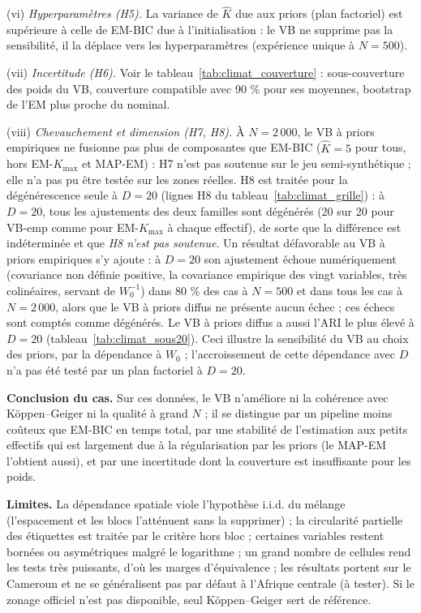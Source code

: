 (vi) \emph{Hyperparamètres (H5).} La variance de $\hat K$ due aux priors (plan factoriel) est supérieure à celle de EM-BIC due à l'initialisation : le VB ne supprime pas la sensibilité, il la déplace vers les hyperparamètres (expérience unique à $N=500$).

(vii) \emph{Incertitude (H6).} Voir le tableau~\ref{tab:climat_couverture} : sous-couverture des poids du VB, couverture compatible avec 90 \% pour ses moyennes, bootstrap de l'EM plus proche du nominal.

(viii) \emph{Chevauchement et dimension (H7, H8).} À $N=2\,000$, le VB à priors empiriques ne fusionne pas plus de composantes que EM-BIC ($\hat K = 5$ pour tous, hors EM-$K_{\max}$ et MAP-EM) : H7 n'est pas soutenue sur le jeu semi-synthétique ; elle n'a pas pu être testée sur les zones réelles. H8 est traitée pour la dégénérescence seule à $D=20$ (lignes H8 du tableau~\ref{tab:climat_grille}) : à $D=20$, tous les ajustements des deux familles sont dégénérés (20 sur 20 pour VB-emp comme pour EM-$K_{\max}$ à chaque effectif), de sorte que la différence est indéterminée et que \emph{H8 n'est pas soutenue}. Un résultat défavorable au VB à priors empiriques s'y ajoute : à $D=20$ son ajustement échoue numériquement (covariance non définie positive, la covariance empirique des vingt variables, très colinéaires, servant de $W_0^{-1}$) dans 80 \% des cas à $N=500$ et dans tous les cas à $N=2\,000$, alors que le VB à priors diffus ne présente aucun échec ; ces échecs sont comptés comme dégénérés. Le VB à priors diffus a aussi l'ARI le plus élevé à $D=20$ (tableau~\ref{tab:climat_sous20}). Ceci illustre la sensibilité du VB au choix des priors, par la dépendance à $W_0$ ; l'accroissement de cette dépendance avec $D$ n'a pas été testé par un plan factoriel à $D=20$.

\textbf{Conclusion du cas. }Sur ces données, le VB n'améliore ni la cohérence avec Köppen--Geiger ni la qualité à grand $N$ ; il se distingue par un pipeline moins coûteux que EM-BIC en temps total, par une stabilité de l'estimation aux petits effectifs qui est largement due à la régularisation par les priors (le MAP-EM l'obtient aussi), et par une incertitude dont la couverture est insuffisante pour les poids.

\textbf{Limites. }La dépendance spatiale viole l'hypothèse i.i.d. du mélange (l'espacement et les blocs l'atténuent sans la supprimer) ; la circularité partielle des étiquettes est traitée par le critère hors bloc ; certaines variables restent bornées ou asymétriques malgré le logarithme ; un grand nombre de cellules rend les tests très puissants, d'où les marges d'équivalence ; les résultats portent sur le Cameroun et ne se généralisent pas par défaut à l'Afrique centrale (à tester). Si le zonage officiel n'est pas disponible, seul Köppen--Geiger sert de référence.


